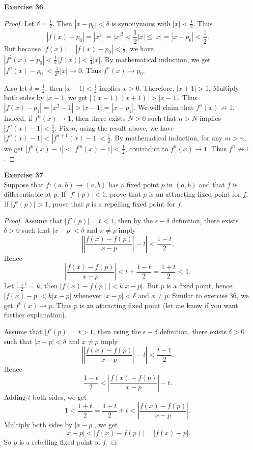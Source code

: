 \documentclass[12pt, a4paper]{article}
\theoremstyle{plain}
\newenvironment{exercise}[2][Exercise]
    { \begin{mdframed}[backgroundcolor=gray!20] \textbf{#1 #2} \\}
    {  \end{mdframed}}
\begin{document}
\begin{exercise}{36}

\end{exercise}
	\begin{proof}
	Let $\delta =\frac{1}{2}$. Then $|x-p_0|<\delta$ is synonymous with $|x|<\frac{1}{2}$. Thus 
	\[
	|f(x)-p_0|=|x^2|=|x|^2<\frac{1}{2}|x|\leq |x|=|x-p_0|<\frac{1}{2}.
	\] 
	But because $|f(x)|=|f(x)-p_0|<\frac{1}{2}$, we have $|f^2(x)-p_0|<\frac{1}{2}|f(x)|<\frac{1}{4}|x|$. By mathematical induction, we get $|f^n(x)-p_0|<\frac{1}{2^n}|x|\rightarrow 0$. Thus $f^n(x)\rightarrow p_0$.
	
	Also let $\delta=\frac{1}{2}$, then $|x-1|<\frac{1}{2}$ implies $x>0$. Therefore, $|x+1|>1$. Multiply both sides by $|x-1$, we get $|(x-1)(x+1)|>|x-1|$. Thus $|f(x)-p_1|=|x^2-1|>|x-1|=|x-p_1|$. We will claim that $f^n(x)\not\rightarrow 1$. Indeed, if $f^n(x)\rightarrow 1$, then there exists $N>0$ such that $n>N$ implies $|f^n(x)-1|<\frac{1}{2}$. Fix $n$, using the result above, we have $|f^n(x)-1|<|f^{n+1}(x)-1|<\frac{1}{2}$. By mathematical induction, for any $m>n$, we get $|f^n(x)-1|<|f^{m}(x)-1|<\frac{1}{2}$, contradict to $f^n(x)\rightarrow 1$. Thus $f^n\not\rightarrow 1$.
	\end{proof}

\pagebreak

\begin{exercise}{37}
Suppose that $f:(a,b)\rightarrow (a,b)$ has a fixed point $p$ in $(a,b)$ and that $f$ is differentiable at $p$. If $|f'(p)|<1$, prove that $p$ is an attracting fixed point for $f$. If $|f'(p)|>1$, prove that $p$ is a repelling fixed point for $f$.
\end{exercise}
	\begin{proof}
	Assume that $|f'(p)|=t<1$, then by the $\epsilon-\delta$ definition, there exists $\delta>0$ such that $|x-p|<\delta$ and $x\neq p$ imply
	\[
	\left|\left|\frac{f(x)-f(p)}{x-p}\right|-t\right|<\frac{1-t}{2}.
	\]
	Hence
	\[
	\left|\frac{f(x)-f(p)}{x-p}\right|<t+\frac{1-t}{2}=\frac{1+t}{2}<1.
	\]
	Let $\frac{1+t}{2}=k$, then $|f(x)-f(p)|<k|x-p|$. But $p$ is a fixed point, hence $|f(x)-p|<k|x-p|$ whenever $|x-p|<\delta$ and $x\neq p$. Similar to exercise 36, we get $f^n(x)\rightarrow p$. Thus $p$ is an attracting fixed point (let me know if you want further explanation).
	
	Assume that $|f'(p)|=t>1$, then using the $\epsilon-\delta$ definition, there exists $\delta>0$ such that $|x-p|<\delta$ and $x\neq p$ imply
	\[
	\left|\left|\frac{f(x)-f(p)}{x-p}\right|-t\right|<\frac{t-1}{2}.
	\]
	Hence
	\[
	\frac{1-t}{2}<\left|\frac{f(x)-f(p)}{x-p}\right|-t.
	\]
	Adding $t$ both sides, we get 
	\[
	1<\frac{1+t}{2}=\frac{1-t}{2}+t<\left|\frac{f(x)-f(p)}{x-p}\right|.
	\]
	Multiply both sides by $|x-p|$, we get
	\[
	|x-p|<|f(x)-f(p)|=|f(x)-p|.
	\]
	So $p$ is a rebelling fixed point of $f$.
	\end{proof}
\end{document}
